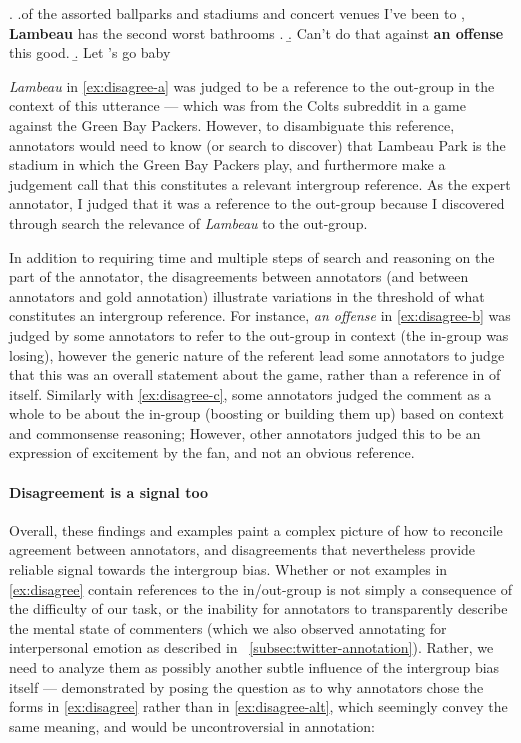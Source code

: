 \ex. \label{ex:disagree} \a.\label{ex:disagree-a}\textellipsis of the assorted ballparks and stadiums and concert venues I've been to , \textbf{Lambeau} has the second worst bathrooms .
    \b. \label{ex:disagree-b} Can’t do that against \textbf{an offense} this good.
    \b. \label{ex:disagree-c} Let ’s go baby

\emph{Lambeau} in \ref{ex:disagree-a} was judged to be a reference to the out-group in the context of this utterance --- which was from the Colts subreddit in a game against the Green Bay Packers. However, to disambiguate this reference, annotators would need to know (or search to discover) that Lambeau Park is the stadium in which the Green Bay Packers play, and furthermore make a judgement call that this constitutes a relevant intergroup reference. As the expert annotator, I judged that it was a reference to the out-group because I discovered through search the relevance of \emph{Lambeau} to the out-group. 

In addition to requiring time and multiple steps of search and reasoning on the part of the annotator, the disagreements between annotators (and between annotators and gold annotation) illustrate variations in the threshold of what constitutes an intergroup reference. For instance, \emph{an offense} in \ref{ex:disagree-b} was judged by some annotators to refer to the out-group in context (the in-group was losing), however the generic nature of the referent lead some annotators to judge that this was an overall statement about the game, rather than a reference in of itself. Similarly with \ref{ex:disagree-c}, some annotators judged the comment as a whole to be about the in-group (boosting or building them up) based on context and commonsense reasoning; However, other annotators judged this to be an expression of excitement by the fan, and not an obvious reference. 

\paragraph{Disagreement is a signal too} Overall, these findings and examples paint a complex picture of how to reconcile agreement between annotators, and disagreements that nevertheless provide reliable signal towards the intergroup bias. Whether or not examples in \ref{ex:disagree} contain references to the in/out-group is not simply a consequence of the difficulty of our task, or the inability for annotators to transparently describe the mental state of commenters (which we also observed annotating for interpersonal emotion as described in \textsection~\ref{subsec:twitter-annotation}). Rather, we need to analyze them as possibly another subtle influence of the intergroup bias itself --- demonstrated by posing the question as to why annotators chose the forms in \ref{ex:disagree} rather than in \ref{ex:disagree-alt}, which seemingly convey the same meaning, and would be uncontroversial in annotation:

